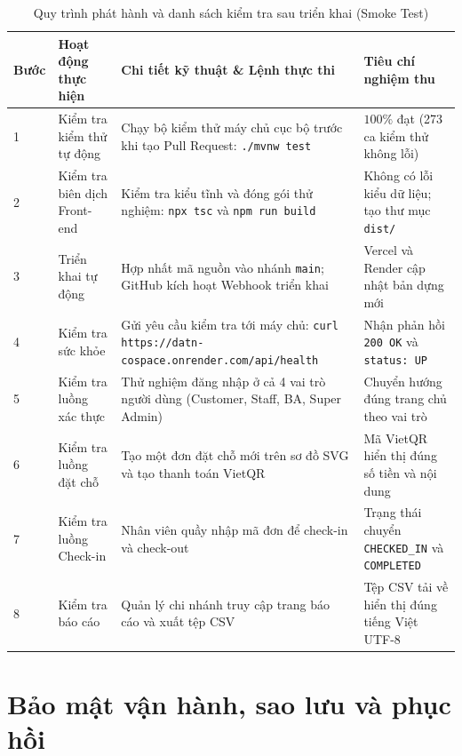 \begin{table}[H]
\centering
\caption{Quy trình phát hành và danh sách kiểm tra sau triển khai (Smoke Test)}
\label{tab:tk_phathanh}
\small
\renewcommand{\arraystretch}{1.25}
\begin{tabular}{|p{1.2cm}|p{3.4cm}|p{5.4cm}|p{3.8cm}|}
\hline
\textbf{Bước} & \textbf{Hoạt động thực hiện} & \textbf{Chi tiết kỹ thuật \& Lệnh thực thi} & \textbf{Tiêu chí nghiệm thu} \\
\hline
1 & Kiểm tra kiểm thử tự động & Chạy bộ kiểm thử máy chủ cục bộ trước khi tạo Pull Request: \texttt{./mvnw test} & $100\%$ đạt (273 ca kiểm thử không lỗi) \\
\hline
2 & Kiểm tra biên dịch Front-end & Kiểm tra kiểu tĩnh và đóng gói thử nghiệm: \texttt{npx tsc} và \texttt{npm run build} & Không có lỗi kiểu dữ liệu; tạo thư mục \texttt{dist/} \\
\hline
3 & Triển khai tự động & Hợp nhất mã nguồn vào nhánh \texttt{main}; GitHub kích hoạt Webhook triển khai & Vercel và Render cập nhật bản dựng mới \\
\hline
4 & Kiểm tra sức khỏe & Gửi yêu cầu kiểm tra tới máy chủ: \texttt{curl https://datn-cospace.onrender.com/api/health} & Nhận phản hồi \texttt{200 OK} và \texttt{status: UP} \\
\hline
5 & Kiểm tra luồng xác thực & Thử nghiệm đăng nhập ở cả 4 vai trò người dùng (Customer, Staff, BA, Super Admin) & Chuyển hướng đúng trang chủ theo vai trò \\
\hline
6 & Kiểm tra luồng đặt chỗ & Tạo một đơn đặt chỗ mới trên sơ đồ SVG và tạo thanh toán VietQR & Mã VietQR hiển thị đúng số tiền và nội dung \\
\hline
7 & Kiểm tra luồng Check-in & Nhân viên quầy nhập mã đơn để check-in và check-out & Trạng thái chuyển \texttt{CHECKED\_IN} và \texttt{COMPLETED} \\
\hline
8 & Kiểm tra báo cáo & Quản lý chi nhánh truy cập trang báo cáo và xuất tệp CSV & Tệp CSV tải về hiển thị đúng tiếng Việt UTF-8 \\
\hline
\end{tabular}
\end{table}

\section{Bảo mật vận hành, sao lưu và phục hồi}
\label{sec:tk_baomat}

